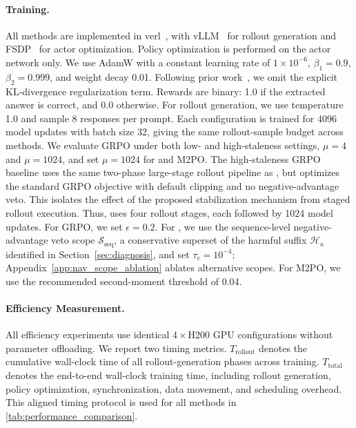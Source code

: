 \paragraph{Training.} All methods are implemented in verl~\citep{Sheng_2025}, with vLLM~\citep{kwon2023efficientmemorymanagementlarge} for rollout generation and FSDP~\citep{zhao2023pytorchfsdpexperiencesscaling} for actor optimization. Policy optimization is performed on the actor network only. We use AdamW with a constant learning rate of $1\times10^{-6}$, $\beta_1=0.9$, $\beta_2=0.999$, and weight decay 0.01. Following prior work~\citep{yu2025dapoopensourcellmreinforcement, zheng2025prosperitycollapsefaroffpolicy}, we omit the explicit KL-divergence regularization term. Rewards are binary: 1.0 if the extracted answer is correct, and 0.0 otherwise.  For rollout generation, we use temperature 1.0 and sample 8 responses per prompt. Each configuration is trained for 4096 model updates with batch size 32, giving the same rollout-sample budget across methods. We evaluate GRPO under both low- and high-staleness settings, $\mu=4$ and $\mu=1024$, and set $\mu=1024$ for \ourmethod{} and M2PO. The high-staleness GRPO baseline uses the same two-phase large-stage rollout pipeline as \ourmethod{}, but optimizes the standard GRPO objective with default clipping and no negative-advantage veto. This isolates the effect of the proposed stabilization mechanism from staged rollout execution. Thus, \ourmethod{} uses four rollout stages, each followed by 1024 model updates.  For GRPO, we set $\epsilon=0.2$. For \ourmethod{}, we use the sequence-level negative-advantage veto scope $\mathcal S_{\mathrm{seq}}$, a conservative superset of the harmful suffix $\mathcal H_\kappa$ identified in Section~\ref{sec:diagnosis}, and set $\tau_c=10^{-4}$; Appendix~\ref{app:nav_scope_ablation} ablates alternative scopes. For M2PO, we use the recommended second-moment threshold of 0.04.  

\paragraph{Efficiency Measurement.} All efficiency experiments use identical $4\times$H200 GPU configurations without parameter offloading. We report two timing metrics. $T_{\mathrm{rollout}}$ denotes the cumulative wall-clock time of all rollout-generation phases across training. $T_{\mathrm{total}}$ denotes the end-to-end wall-clock training time, including rollout generation, policy optimization, synchronization, data movement, and scheduling overhead. This aligned timing protocol is used for all methods in \cref{tab:performance_comparison}. 

